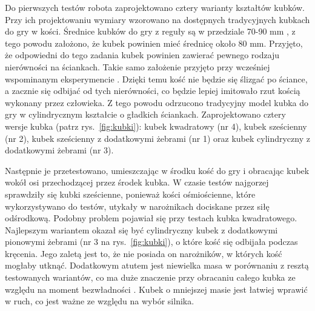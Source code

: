 Do pierwszych testów robota zaprojektowano cztery warianty kształtów kubków. Przy ich projektowaniu wymiary wzorowano na dostępnych tradycyjnych kubkach do gry w kości.
Średnice kubków do gry z reguły są w przedziale 70-90 mm \cite{cup}, z tego powodu założono, że kubek powinien mieć średnicę około 80 mm. Przyjęto, że odpowiedni do tego zadania kubek powinien
zawierać pewnego rodzaju nierówności na ściankach. Takie samo założenie przyjęto przy wcześniej wspominanym eksperymencie \cite{PK}. Dzięki temu kość nie będzie się ślizgać po ściance, a zacznie się odbijać od tych nierówności, co 
będzie lepiej imitowało rzut kością wykonany przez człowieka. Z tego powodu odrzucono tradycyjny model kubka do gry w cylindrycznym kształcie 
o gładkich ściankach. Zaprojektowano cztery wersje kubka (patrz rys.~\ref{fig:kubki}): kubek kwadratowy (nr 4), kubek sześcienny (nr 2), kubek sześcienny z dodatkowymi żebrami (nr 1)
oraz kubek cylindryczny z dodatkowymi żebrami (nr 3). 

Następnie je przetestowano, umieszczając w środku kość do gry i obracając kubek wokół osi przechodzącej przez środek kubka. W czasie testów najgorzej sprawdziły się kubki sześcienne,
ponieważ kości ośmiościenne, które wykorzystywano do testów, utykały w narożnikach dociskane przez siłę odśrodkową. Podobny problem pojawiał się przy testach kubka kwadratowego.
Najlepszym wariantem okazał się być cylindryczny kubek z dodatkowymi pionowymi żebrami (nr 3 na rys.~\ref{fig:kubki}), o które kość się odbijała podczas kręcenia.
Jego zaletą jest to, że nie posiada on narożników, w których kość mogłaby utknąć. Dodatkowym atutem jest niewielka masa w porównaniu z resztą testowanych wariantów, co ma duże znaczenie 
przy obracaniu całego kubka ze względu na moment bezwładności \cite{bezwladnosc}. Kubek o mniejszej masie jest łatwiej wprawić w ruch, co jest ważne ze względu na wybór silnika.

